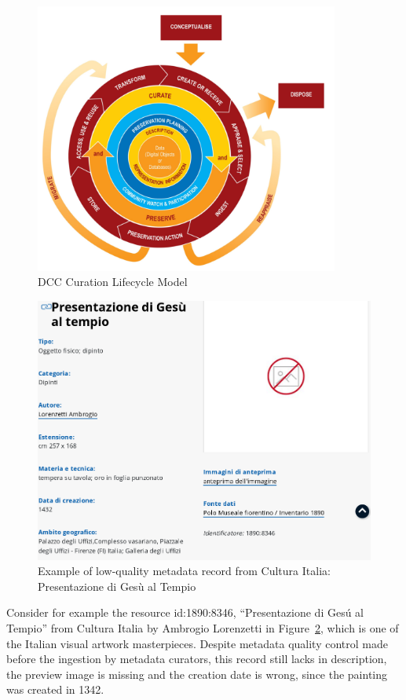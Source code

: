 \documentclass[epsfig,a4paper,12pt,titlepage]{book}
\begin{document}
\begin{figure}[H]
\centering
\includegraphics[width=10cm]{figura1}
\caption{DCC Curation Lifecycle Model}
\label{figura1}
\end{figure}




\begin{figure}[h!]
\includegraphics[width=16cm]{Firefox_Screenshot_2019-01-30T08-01-38.582Z.png}
\caption{Example of low-quality metadata record from Cultura Italia: Presentazione di Ges\`u al Tempio}
\label{example}
\end{figure}


Consider for example the resource id:1890:8346, ``Presentazione di Ges\'u al Tempio'' from Cultura Italia by Ambrogio Lorenzetti in Figure~\ref{example}, which is one of the Italian visual artwork masterpieces. Despite metadata quality control made before the ingestion by metadata curators, this record still lacks in  description, the preview image is missing and the creation date is wrong,  since the painting was created in 1342.
\end{document}
